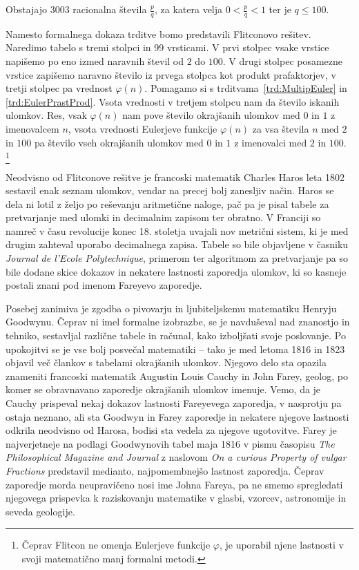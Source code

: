 \documentclass[mat1]{fmfdelo}
\begin{document}
\begin{trditev}
Obstajajo $3003$ racionalna števila $\frac{p}{q}$, za katera velja $0<\frac{p}{q}<1$ ter je $q \leq 100$.
\end{trditev}

Namesto formalnega dokaza trditve bomo predstavili Flitconovo rešitev. Naredimo tabelo s tremi stolpci in 99 vrsticami. V prvi stolpec vsake vrstice napišemo po eno izmed naravnih števil od $2$ do $100$. V drugi stolpec posamezne vrstice zapišemo naravno število iz prvega stolpca kot produkt prafaktorjev, v tretji stolpec pa vrednost $\varphi(n)$. Pomagamo si s trditvama~\ref{trd:MultipEuler} in \ref{trd:EulerPrastProd}. Vsota vrednosti v tretjem stolpcu nam da število iskanih ulomkov. Res, vsak $\varphi(n)$ nam pove število okrajšanih ulomkov med $0$ in $1$ z imenovalcem $n$, vsota vrednosti Eulerjeve funkcije $\varphi(n)$ za vsa števila $n$ med $2$ in $100$ pa število vseh okrajšanih ulomkov med $0$ in $1$ z imenovalci med $2$ in $100$. \footnote{Čeprav Flitcon ne omenja Eulerjeve funkcije $\varphi$, je uporabil njene lastnosti v svoji matematično manj formalni metodi.}

Neodvisno od Flitconove rešitve je francoski matematik Charles Haros leta 1802 sestavil enak seznam ulomkov, vendar na precej bolj zanesljiv način. Haros se dela ni lotil z željo po reševanju aritmetične naloge, pač pa je pisal tabele za pretvarjanje med ulomki in decimalnim zapisom ter obratno. V Franciji so namreč v času revolucije konec 18. stoletja uvajali nov metrični sistem, ki je med drugim zahteval uporabo decimalnega zapisa. Tabele so bile objavljene v časniku \emph{Journal de l'Ecole Polytechnique}, primerom ter algoritmom za pretvarjanje pa so bile dodane skice dokazov in nekatere lastnosti zaporedja ulomkov, ki so kasneje postali znani pod imenom Fareyevo zaporedje. 

Posebej zanimiva je zgodba o pivovarju in ljubiteljskemu matematiku Henryju Goodwynu. Čeprav ni imel formalne izobrazbe, se je navduševal nad znanostjo in tehniko, sestavljal različne tabele in računal, kako izboljšati svoje poslovanje. Po upokojitvi se je vse bolj posvečal matematiki -- tako je med letoma 1816 in 1823 objavil več člankov s tabelami okrajšanih ulomkov. Njegovo delo sta opazila znameniti francoski matematik Augustin Louis Cauchy in John Farey, geolog, po komer se obravnavano zaporedje okrajšanih ulomkov imenuje. Vemo, da je Cauchy prispeval nekaj dokazov lastnosti Fareyevega zaporedja, v nasprotju pa ostaja neznano, ali sta Goodwyn in Farey zaporedje in nekatere njegove lastnosti odkrila neodvisno od Harosa, bodisi sta vedela za njegove ugotovitve. Farey je najverjetneje na podlagi Goodwynovih tabel maja 1816 v pismu časopisu \emph{The Philosophical Magazine and Journal} z naslovom \emph{On a curious Property of vulgar Fractions} predstavil medianto, najpomembnejšo lastnost zaporedja. Čeprav zaporedje morda neupravičeno nosi ime Johna Fareya, pa ne smemo spregledati njegovega prispevka k raziskovanju matematike v glasbi, vzorcev, astronomije in seveda geologije.
\end{document}
